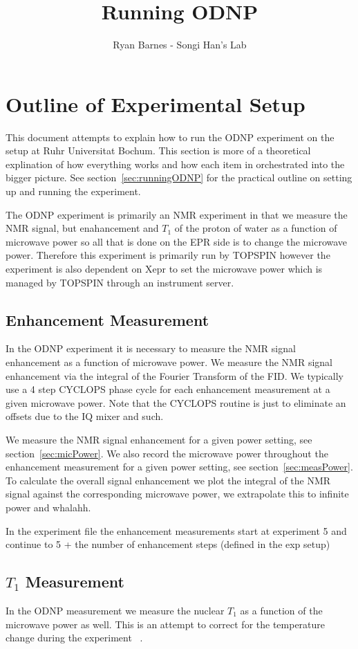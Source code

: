 \documentclass{article}
\title{Running ODNP}
\author{Ryan Barnes - Songi Han's Lab}
\begin{document}
\maketitle

\section{Outline of Experimental Setup}
This document attempts to explain how to run the ODNP experiment on the setup at Ruhr Universitat Bochum. This section is more of a theoretical explination of how everything works and how each item in orchestrated into the bigger picture. See section~\ref{sec:runningODNP} for the practical outline on setting up and running the experiment.

The ODNP experiment is primarily an NMR experiment in that we measure the NMR signal, but enahancement and $T_1$ of the proton of water as a function of microwave power so all that is done on the EPR side is to change the microwave power. Therefore this experiment is primarily run by TOPSPIN however the experiment is also dependent on Xepr to set the microwave power which is managed by TOPSPIN through an instrument server.

\subsection{Enhancement Measurement}
In the ODNP experiment it is necessary to measure the NMR signal enhancement as a function of microwave power. We measure the NMR signal enhancement via the integral of the Fourier Transform of the FID. We typically use a 4 step CYCLOPS phase cycle for each enhancement measurement at a given microwave power. Note that the CYCLOPS routine is just to eliminate an offsets due to the IQ mixer and such.

We measure the NMR signal enhancement for a given power setting, see section~\ref{sec:micPower}. We also record the microwave power throughout the enhancement measurement for a given power setting, see section~\ref{sec:measPower}. To calculate the overall signal enhancement we plot the integral of the NMR signal against the corresponding microwave power, we extrapolate this to infinite power and whalahh.

In the experiment file the enhancement measurements start at experiment 5 and continue to 5 + the number of enhancement steps (defined in the exp setup)

\subsection{$T_1$ Measurement}
In the ODNP measurement we measure the nuclear $T_1$ as a function of the microwave power as well. This is an attempt to correct for the temperature change during the experiment ~\cite{Franck2013}.
\end{document}
